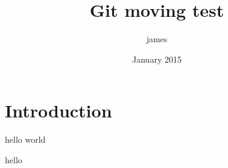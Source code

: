 \documentclass{article}
\title{Git moving test}
\author{james }
\date{January 2015}
\begin{document}
\maketitle

\section{Introduction}

hello world





hello
\end{document}
